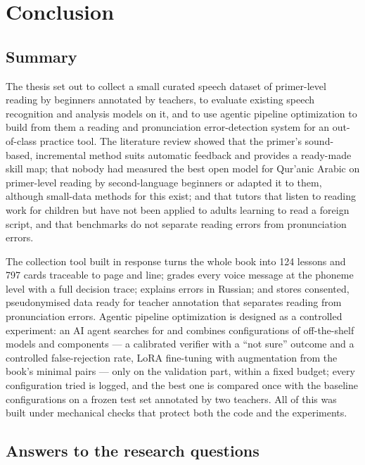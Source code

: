\chapter{Conclusion}\label{ch:concl}

\section{Summary}

The thesis set out to collect a small curated speech dataset of primer-level reading by beginners annotated by
teachers, to evaluate existing speech recognition and analysis models on it, and to use agentic pipeline optimization to build from them a reading and pronunciation error-detection system for an out-of-class practice tool.
The literature review showed that the primer's sound-based, incremental method suits automatic feedback and
provides a ready-made skill map; that nobody had measured the best open model for Qur'anic Arabic on
primer-level reading by second-language beginners or adapted it to them, although small-data methods for this
exist; and that tutors that listen to reading work for children but have not been applied to adults learning to read a foreign script, and that benchmarks do not separate reading errors from pronunciation errors.

The collection tool built in response turns the whole book into 124 lessons and 797 cards traceable to page and
line; grades every voice message at the phoneme level with a full decision trace; explains errors in Russian;
and stores consented, pseudonymised data ready for teacher annotation that separates reading from pronunciation
errors. Agentic pipeline optimization is designed as a controlled experiment: an AI agent searches for and combines
configurations of off-the-shelf models and components --- a calibrated verifier with a ``not sure'' outcome and a controlled
false-rejection rate, LoRA fine-tuning with augmentation from the book's minimal pairs --- only on the validation part, within a fixed budget; every configuration tried is logged, and the best one is compared once with the baseline configurations on a frozen test set annotated by two teachers. All of this was built under mechanical checks
that protect both the code and the experiments.

\section{Answers to the research questions}

